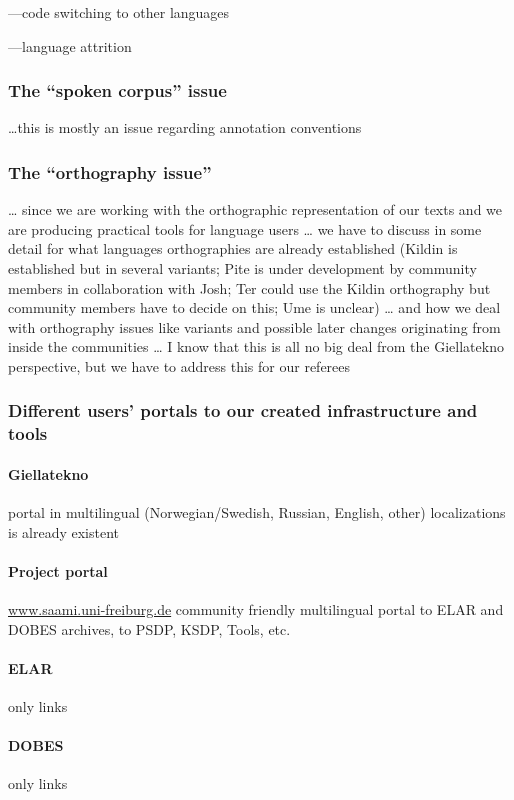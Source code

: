 \documentclass[a4paper,12pt]{article}
\begin{document}
---code switching to other languages

---language attrition

\subsubsection{The “spoken corpus” issue}
…this is mostly an issue regarding annotation conventions

\subsubsection{The “orthography issue”}
… since we are working with the orthographic representation of our texts and we are producing practical tools for language users … we have to discuss in some detail for what languages orthographies are already established (Kildin is established but in several variants; Pite is under development by community members in collaboration with Josh; Ter could use the Kildin orthography but community members have to decide on this; Ume is unclear) … and how we deal with orthography issues like variants and possible later changes originating from inside the communities … I know that this is all no big deal from the Giellatekno perspective, but we have to address this for our referees 

\subsubsection{Different users' portals to our created infrastructure and tools}

\paragraph{Giellatekno} portal in multilingual (Norwegian/Swedish, Russian, English, other) localizations is already existent

\paragraph{Project portal} \url{www.saami.uni-freiburg.de} community friendly multilingual portal to ELAR and DOBES archives, to PSDP, KSDP, Tools, etc. 

\paragraph{ELAR} only links

\paragraph{DOBES} only links
\end{document}
